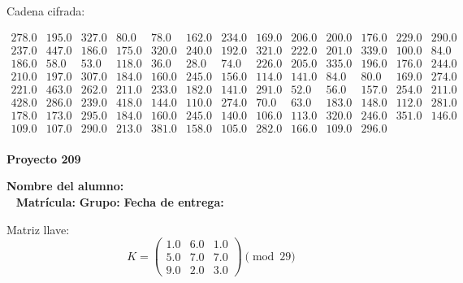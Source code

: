 \documentclass[12pt]{article}
\begin{document}
Cadena cifrada:
\begin{center}
$\begin{array}{lllllllllllll}
278.0 & 195.0 & 327.0 & 80.0 & 78.0 & 162.0 & 234.0 & 169.0 & 206.0 & 200.0 & 176.0 & 229.0 & 290.0\\
237.0 & 447.0 & 186.0 & 175.0 & 320.0 & 240.0 & 192.0 & 321.0 & 222.0 & 201.0 & 339.0 & 100.0 & 84.0\\
186.0 & 58.0 & 53.0 & 118.0 & 36.0 & 28.0 & 74.0 & 226.0 & 205.0 & 335.0 & 196.0 & 176.0 & 244.0\\
210.0 & 197.0 & 307.0 & 184.0 & 160.0 & 245.0 & 156.0 & 114.0 & 141.0 & 84.0 & 80.0 & 169.0 & 274.0\\
221.0 & 463.0 & 262.0 & 211.0 & 233.0 & 182.0 & 141.0 & 291.0 & 52.0 & 56.0 & 157.0 & 254.0 & 211.0\\
428.0 & 286.0 & 239.0 & 418.0 & 144.0 & 110.0 & 274.0 & 70.0 & 63.0 & 183.0 & 148.0 & 112.0 & 281.0\\
178.0 & 173.0 & 295.0 & 184.0 & 160.0 & 245.0 & 140.0 & 106.0 & 113.0 & 320.0 & 246.0 & 351.0 & 146.0\\
109.0 & 107.0 & 290.0 & 213.0 & 381.0 & 158.0 & 105.0 & 282.0 & 166.0 & 109.0 & 296.0\\
\end{array}$
\end{center}

\newpage


\textbf{Proyecto 209}

\textbf{Nombre del alumno:} \underline{\hspace{13cm}}\\\
\vspace{1cm}
\textbf{Matrícula:} \underline{\hspace{4cm}} \hspace{1cm}
\textbf{Grupo:} \underline{\hspace{2cm}}
\textbf{Fecha de entrega:} \underline{\hspace{2cm}}

\medskip

Matriz llave:
\[
K = \begin{pmatrix}
1.0 & 6.0 & 1.0\\
5.0 & 7.0 & 7.0\\
9.0 & 2.0 & 3.0
\end{pmatrix} \pmod{29}
\]
\end{document}
